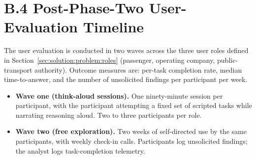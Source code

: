 \section*{B.4 Post-Phase-Two User-Evaluation Timeline}

The user evaluation is conducted in two waves across the three user roles defined in Section~\ref{sec:solution:problem:roles} (passenger, operating company, public-transport authority). Outcome measures are: per-task completion rate, median time-to-answer, and the number of unsolicited findings per participant per week.

\begin{itemize}
    \item \textbf{Wave one (think-aloud sessions).} One ninety-minute session per participant, with the participant attempting a fixed set of scripted tasks while narrating reasoning aloud. Two to three participants per role.
    \item \textbf{Wave two (free exploration).} Two weeks of self-directed use by the same participants, with weekly check-in calls. Participants log unsolicited findings; the analyst logs task-completion telemetry.
\end{itemize}
